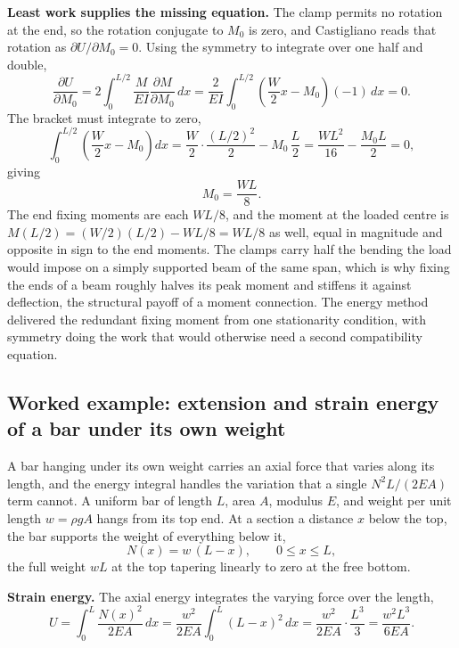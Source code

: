 \textbf{Least work supplies the missing equation.} The clamp permits no
rotation at the end, so the rotation conjugate to $M_0$ is zero, and
Castigliano reads that rotation as $\partial U/\partial M_0 = 0$. Using the
symmetry to integrate over one half and double,
\[
\frac{\partial U}{\partial M_0}
= 2\int_0^{L/2}\frac{M}{EI}\frac{\partial M}{\partial M_0}\,dx
= \frac{2}{EI}\int_0^{L/2}\!\!\left(\frac{W}{2}x - M_0\right)(-1)\,dx = 0.
\]
The bracket must integrate to zero,
\[
\int_0^{L/2}\!\!\left(\frac{W}{2}x - M_0\right)dx
= \frac{W}{2}\cdot\frac{(L/2)^2}{2} - M_0\,\frac{L}{2}
= \frac{W L^2}{16} - \frac{M_0 L}{2} = 0,
\]
giving
\[
M_0 = \frac{W L}{8}.
\]
The end fixing moments are each $WL/8$, and the moment at the loaded centre
is $M(L/2) = (W/2)(L/2) - WL/8 = WL/8$ as well, equal in magnitude and
opposite in sign to the end moments. The clamps carry half the bending the
load would impose on a simply supported beam of the same span, which is why
fixing the ends of a beam roughly halves its peak moment and stiffens it
against deflection, the structural payoff of a moment connection. The energy
method delivered the redundant fixing moment from one stationarity condition,
with symmetry doing the work that would otherwise need a second
compatibility equation.

\subsection{Worked example: extension and strain energy of a bar under its
own weight}

A bar hanging under its own weight carries an axial force that varies along
its length, and the energy integral handles the variation that a single
$N^2L/(2EA)$ term cannot. A uniform bar of length $L$, area $A$, modulus $E$,
and weight per unit length $w = \rho g A$ hangs from its top end. At a
section a distance $x$ below the top, the bar supports the weight of
everything below it,
\[
N(x) = w\,(L - x),\qquad 0\le x\le L,
\]
the full weight $wL$ at the top tapering linearly to zero at the free bottom.

\textbf{Strain energy.} The axial energy integrates the varying force over
the length,
\[
U = \int_0^L \frac{N(x)^2}{2EA}\,dx
= \frac{w^2}{2EA}\int_0^L (L-x)^2\,dx
= \frac{w^2}{2EA}\cdot\frac{L^3}{3}
= \frac{w^2 L^3}{6EA}.
\]

